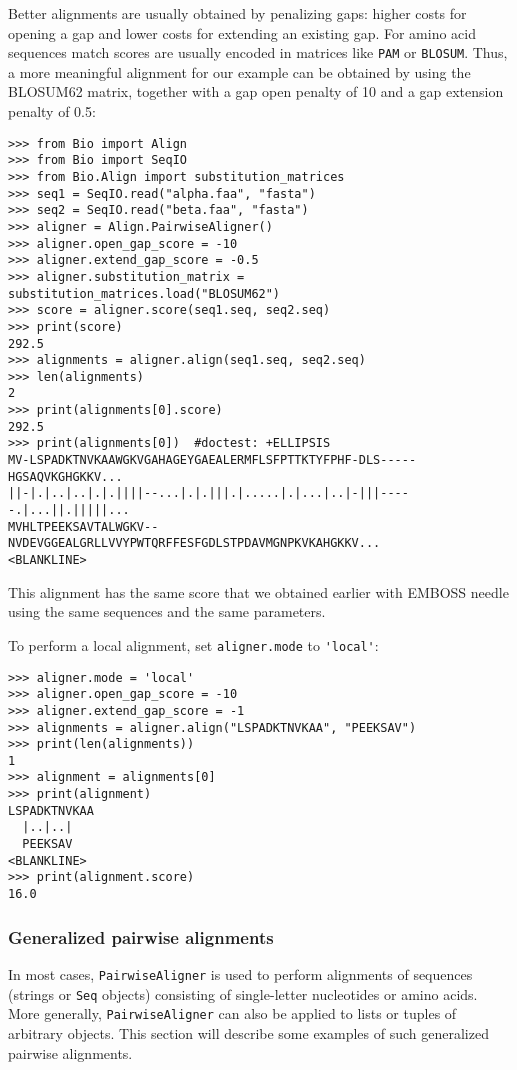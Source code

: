 Better alignments are usually obtained by penalizing gaps: higher costs
for opening a gap and lower costs for extending an existing gap. For amino
acid sequences match scores are usually encoded in matrices like \texttt{PAM}
or \texttt{BLOSUM}. Thus, a more meaningful alignment for our example can be
obtained by using the BLOSUM62 matrix, together with a gap open penalty of 10
and a gap extension penalty of 0.5:

\begin{verbatim}
>>> from Bio import Align
>>> from Bio import SeqIO
>>> from Bio.Align import substitution_matrices
>>> seq1 = SeqIO.read("alpha.faa", "fasta")
>>> seq2 = SeqIO.read("beta.faa", "fasta")
>>> aligner = Align.PairwiseAligner()
>>> aligner.open_gap_score = -10
>>> aligner.extend_gap_score = -0.5
>>> aligner.substitution_matrix = substitution_matrices.load("BLOSUM62")
>>> score = aligner.score(seq1.seq, seq2.seq)
>>> print(score)
292.5
>>> alignments = aligner.align(seq1.seq, seq2.seq)
>>> len(alignments)
2
>>> print(alignments[0].score)
292.5
>>> print(alignments[0])  #doctest: +ELLIPSIS
MV-LSPADKTNVKAAWGKVGAHAGEYGAEALERMFLSFPTTKTYFPHF-DLS-----HGSAQVKGHGKKV...
||-|.|..|..|.|.||||--...|.|.|||.|.....|.|...|..|-|||-----.|...||.|||||...
MVHLTPEEKSAVTALWGKV--NVDEVGGEALGRLLVVYPWTQRFFESFGDLSTPDAVMGNPKVKAHGKKV...
<BLANKLINE>
\end{verbatim}

This alignment has the same score that we obtained earlier with EMBOSS needle
using the same sequences and the same parameters.

To perform a local alignment, set \verb+aligner.mode+ to \verb+'local'+:

\begin{verbatim}
>>> aligner.mode = 'local'
>>> aligner.open_gap_score = -10
>>> aligner.extend_gap_score = -1
>>> alignments = aligner.align("LSPADKTNVKAA", "PEEKSAV")
>>> print(len(alignments))
1
>>> alignment = alignments[0]
>>> print(alignment)
LSPADKTNVKAA
  |..|..|   
  PEEKSAV   
<BLANKLINE>
>>> print(alignment.score)
16.0
\end{verbatim}

\subsubsection{Generalized pairwise alignments}
\label{sec:generalized-pairwise}

In most cases, \verb+PairwiseAligner+ is used to perform alignments of sequences (strings or \verb+Seq+ objects) consisting of single-letter nucleotides or amino acids. More generally, \verb+PairwiseAligner+ can also be applied to lists or tuples of arbitrary objects. This section will describe some examples of such generalized pairwise alignments.

